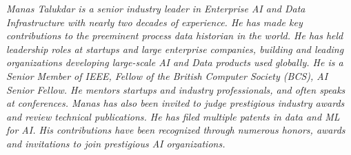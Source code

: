 {\selectfont
	\begin{justify}\textit{Manas Talukdar is a senior industry leader in Enterprise AI and Data Infrastructure with nearly two decades of experience. He has made key contributions to the preeminent process data historian in the world. He has held leadership roles at startups and large enterprise companies, building and leading organizations developing large-scale AI and Data products used globally. He is a Senior Member of IEEE, Fellow of the British Computer Society (BCS), AI Senior Fellow. He mentors startups and industry professionals, and often speaks at conferences. Manas has also been invited to judge prestigious industry awards and review technical publications. He has filed multiple patents in data and ML for AI. His contributions have been recognized through numerous honors, awards and invitations to join prestigious AI organizations.}\end{justify}
}
\vspace{-12pt}